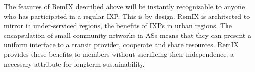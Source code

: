 

The features of RemIX described above will be instantly recognizable to anyone
who has participated in a regular \ac{IXP}. This is by design. RemIX is
architected to mirror in under-serviced regions, the benefits of \acp{IXP} in
urban regions. The encapsulation of small community networks in \acp{AS} means
that they can present a uniform interface to a transit provider, cooperate and
share resources. RemIX provides these benefits to members without sacrificing
their independence, a necessary attribute for longterm sustainability.
%
